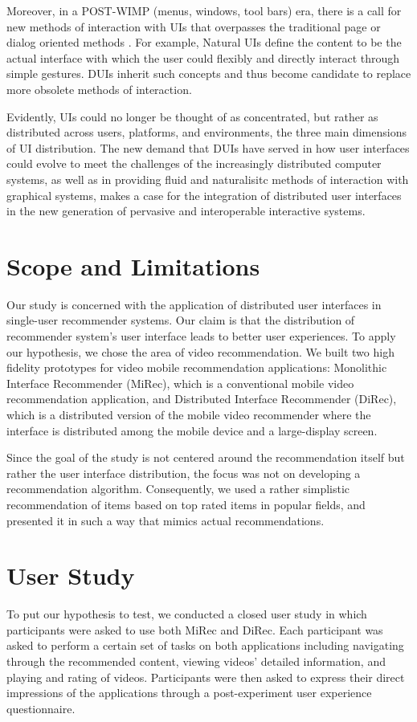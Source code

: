 Moreover, in a POST-WIMP (menus, windows, tool bars) era, there is a call for
new methods of interaction with UIs that overpasses the traditional page or dialog
oriented methods \cite{seifried2011lessons}. For example, Natural UIs
define the content to be the actual interface with which the user could flexibly and directly interact through simple gestures. DUIs inherit such
concepts and thus become candidate to replace more obsolete methods of
interaction.\par
Evidently, UIs could no longer be thought of as concentrated, but rather as
distributed across users, platforms, and environments, the three main dimensions
of UI distribution. The new demand that DUIs have served in how user interfaces
could evolve to meet the challenges of the increasingly distributed computer
systems, as well as in providing fluid and naturalisitc methods of interaction
with graphical systems, makes a case for the integration of distributed user
interfaces in the new generation of pervasive and interoperable interactive
systems.
\section{Scope and Limitations}
Our study is concerned with the application of distributed user interfaces in
single-user recommender systems. Our claim is that the distribution of
recommender system's user interface leads to better user experiences. To apply
our hypothesis, we chose the area of video recommendation. We built two high
fidelity prototypes for video mobile recommendation applications: Monolithic
Interface Recommender (MiRec), which is a conventional mobile video
recommendation application, and Distributed Interface Recommender (DiRec), which is a distributed version of the mobile video recommender where the interface is distributed among
the mobile device and a large-display screen.\par
Since the goal of the study is not centered around the recommendation itself but
rather the user interface distribution, the focus was not on developing a
recommendation algorithm. Consequently, we used a rather simplistic
recommendation of items based on top rated items in popular fields, and
presented it in such a way that mimics actual recommendations.

\section{User Study}
To put our hypothesis to test, we conducted a closed user study in which
participants were asked to use both MiRec and DiRec. Each
participant was asked to perform a certain set of tasks on both applications
including navigating through the recommended content, viewing videos' detailed
information, and playing and rating of videos. Participants were then asked to
express their direct impressions of the applications through a post-experiment
user experience questionnaire.

